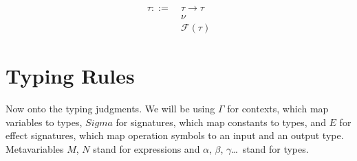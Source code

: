 \begin{align*}
  \tau ::= \
  & \tau \to \tau \\
  & \nu \\
  & \mathcal{F}(\tau)
\end{align*}


\section{Typing Rules}

Now onto the typing judgments. We will be using $\Gamma$ for contexts,
which map variables to types, $Sigma$ for signatures, which map constants
to types, and $E$ for effect signatures, which map operation symbols to an
input and an output type. Metavariables $M$, $N$ stand for expressions and
$\alpha$, $\beta$, $\gamma$\ldots\ stand for types.

